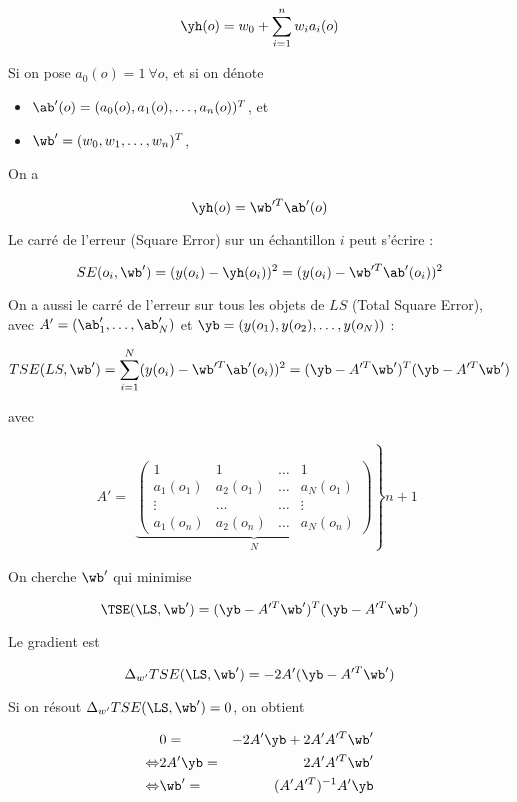 	$$\yh(o) = w_0 + \sum_{i = 1}^n w_i a_i(o)$$
	
	Si on pose $a_0(o) = 1 \: \forall o$, et si on dénote
	
	\begin{itemize}
		\item $\ab'(o) = (a_0(o), a_1(o), \dots , a_n(o))^T$, et
		\item $\wb' = (w_0, w_1, \dots , w_n)^T$,
	\end{itemize}
	
	On a 
	
	$$\yh(o) = \wb'^T\ab'(o)$$
	
	Le carré de l'erreur (Square Error) sur un échantillon $i$ peut s'écrire :
	
	$$SE(o_i, \wb') = (y(o_i) - \yh(o_i))^2 = (y(o_i) - \wb'^T\ab'(o_i))^2$$
	
	On a aussi le carré de l'erreur sur tous les objets de $LS$ (Total Square Error), avec $A' = (\ab'_1, \dots , \ab'_N)$ et $\yb = (y(o_1), y(o_2), \dots , y(o_N))$ :
	
	$$TSE(LS, \wb') = \sum_{i = 1}^N (y(o_i) - \wb'^T\ab'(o_i))^2 = (\yb - A'^T\wb')^T(\yb - A'^T\wb')$$
	
	avec
	
	$$A' = \begin{array}{c}\left. \underbrace{\begin{pmatrix}
	1 & 1 & \dots & 1 \\ 
	a_1(o_1) & a_2(o_1) & \dots & a_N(o_1) \\ 
	\vdots & \dots & \dots & \vdots \\ 
	a_1(o_n) & a_2(o_n) & \dots & a_N(o_n)
	\end{pmatrix}}_{N}\right\} n + 1\end{array} $$
	
		
	On cherche $\wb'$ qui minimise
		
	$$\TSE(\LS, \wb') = (\yb - A'^T\wb')^T(\yb - A'^T\wb')$$
		
	Le gradient est
		
	$$\Delta_{w'} TSE(\LS, \wb') = -2 A' (\yb - A'^T\wb')$$
		
	Si on résout $\Delta_{w'} TSE(\LS, \wb') = 0$, on obtient
	
	\begin{eqnarray*}
	& 0 = & -2A'\yb + 2A'A'^T\wb' \\
	\Leftrightarrow & 2A'\yb = & 2A'A'^T\wb' \\
	\Leftrightarrow & \wb' = & (A'A'^T)^{-1}A'\yb
	\end{eqnarray*}
		
